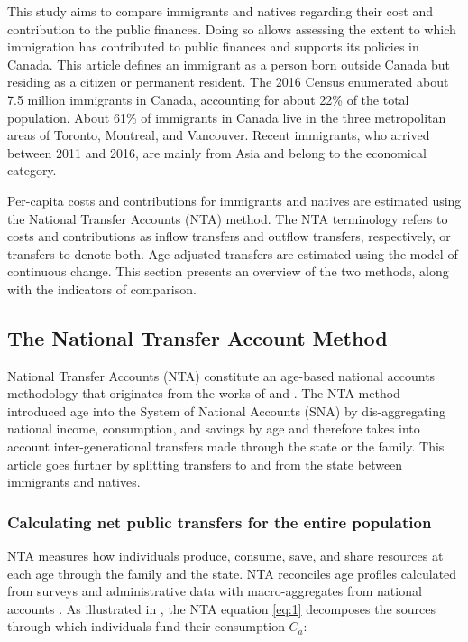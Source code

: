 This study aims to compare immigrants and natives regarding their cost and contribution to the public finances.
Doing so allows assessing the extent to which immigration has contributed to public finances and supports its policies in Canada.
This article defines an immigrant as a person born outside Canada but residing as a citizen or permanent resident.
The 2016 Census enumerated about 7.5 million immigrants in Canada, accounting for about 22\% of the total population.
About 61\% of immigrants in Canada live in the three metropolitan areas of Toronto, Montreal, and Vancouver.
Recent immigrants, who arrived between 2011 and 2016, are mainly from Asia and belong to the economical category.

\vspace{0.7em}\par
Per-capita costs and contributions for immigrants and natives are estimated using the National Transfer Accounts (NTA) method.
The NTA terminology refers to costs and contributions as inflow transfers and outflow transfers, respectively, or transfers to denote both.
Age-adjusted transfers are estimated using the model of continuous change.
This section presents an overview of the two methods, along with the indicators of comparison.

\subsection{The National Transfer Account Method}\label{sec:nta}
National Transfer Accounts (NTA) constitute an age-based national accounts methodology that originates from the works of \citet{Lee:1980ci} and \citet{Mason:1988fz}.
The NTA method introduced age into the System of National Accounts (SNA) by dis-aggregating national income, consumption, and savings by age and therefore takes into account inter-generational transfers made through the state or the family.
This article goes further by splitting transfers to and from the state between immigrants and natives.

\subsubsection*{Calculating net public transfers for the entire population}
NTA measures how individuals produce, consume, save, and share resources at each age through the family and the state.
NTA reconciles age profiles calculated from surveys and administrative data with macro-aggregates from national accounts \citep{UnitedNations:2013vz}.
As illustrated in \citet{dAlbis:2019de}, the NTA equation \eqref{eq:1} decomposes the sources through which individuals fund their consumption \(C_a\):

